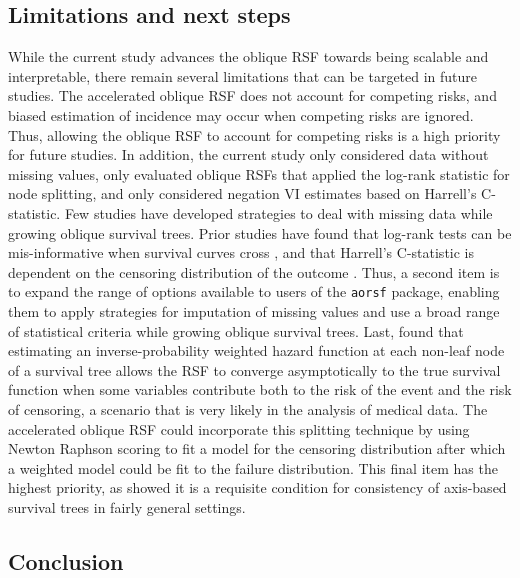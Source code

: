 \documentclass[12pt]{article}\usepackage[]{graphicx}\usepackage[]{xcolor}
\begin{document}
\subsection{Limitations and next steps}

While the current study advances the oblique RSF towards being scalable and interpretable, there remain several limitations that can be targeted in future studies. The accelerated oblique RSF does not account for competing risks, and biased estimation of incidence may occur when competing risks are ignored. Thus, allowing the oblique RSF to account for competing risks is a high priority for future studies. In addition, the current study only considered data without missing values, only evaluated oblique RSFs that applied the log-rank statistic for node splitting, and only considered negation VI estimates based on Harrell's C-statistic. Few studies have developed strategies to deal with missing data while growing oblique survival trees. Prior studies have found that log-rank tests can be mis-informative when survival curves cross \citep{li2015statistical}, and that Harrell's C-statistic is dependent on the censoring distribution of the outcome \citep{uno2011c}. Thus, a second item is to expand the range of options available to users of the \texttt{aorsf} package, enabling them to apply strategies for imputation of missing values and use a broad range of statistical criteria while growing oblique survival trees. Last, \citet{cui2017consistency} found that estimating an inverse-probability weighted hazard function at each non-leaf node of a survival tree allows the RSF to converge asymptotically to the true survival function when some variables contribute both to the risk of the event and the risk of censoring, a scenario that is very likely in the analysis of medical data. The accelerated oblique RSF could incorporate this splitting technique by using Newton Raphson scoring to fit a model for the censoring distribution after which a weighted model could be fit to the failure distribution. This final item has the highest priority, as \citet{cui2017consistency} showed it is a requisite condition for consistency of axis-based survival trees in fairly general settings.


\subsection{Conclusion}
\end{document}
